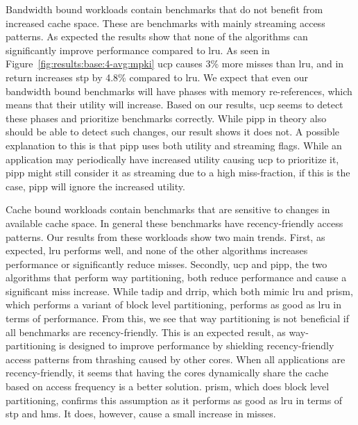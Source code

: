 Bandwidth bound workloads contain benchmarks that do not benefit from increased cache space.
These are benchmarks with mainly streaming access patterns. 
As expected the results show that none of the algorithms can significantly improve performance compared to \gls{lru}.
As seen in Figure~\ref{fig:results:base:4-avg:mpki} \gls{ucp} causes 3\% more misses than \gls{lru}, and in return increases \gls{stp} by 4.8\% compared to \gls{lru}.
We expect that even our bandwidth bound benchmarks will have phases with memory re-references, which means that their utility will increase.
Based on our results, \gls{ucp} seems to detect these phases and prioritize benchmarks correctly.
While \gls{pipp} in theory also should be able to detect such changes, our result shows it does not.
A possible explanation to this is that \gls{pipp} uses both utility and streaming flags.
While an application may periodically have increased utility causing \gls{ucp} to prioritize it, \gls{pipp} might still consider it as streaming due to a high miss-fraction, if this is the case, \gls{pipp} will ignore the increased utility.

Cache bound workloads contain benchmarks that are sensitive to changes in available cache space.
In general these benchmarks have recency-friendly access patterns.
Our results from these workloads show two main trends.
First, as expected, \gls{lru} performs well, and none of the other algorithms increases performance or significantly reduce misses.
Secondly, \gls{ucp} and \gls{pipp}, the two algorithms that perform way partitioning, both reduce performance and cause a significant miss increase. 
While \gls{tadip} and \gls{drrip}, which both mimic \gls{lru} and \gls{prism}, which performs a variant of block level partitioning, performs as good as \gls{lru} in terms of performance.
From this, we see that way partitioning is not beneficial if all benchmarks are recency-friendly.
This is an expected result, as way-partitioning is designed to improve performance by shielding recency-friendly access patterns from thrashing caused by other cores.
When all applications are recency-friendly, it seems that having the cores dynamically share the cache based on access frequency is a better solution.
\gls{prism}, which does block level partitioning, confirms this assumption as it performs as good as \gls{lru} in terms of \gls{stp} and \gls{hms}.
It does, however, cause a small increase in misses.


